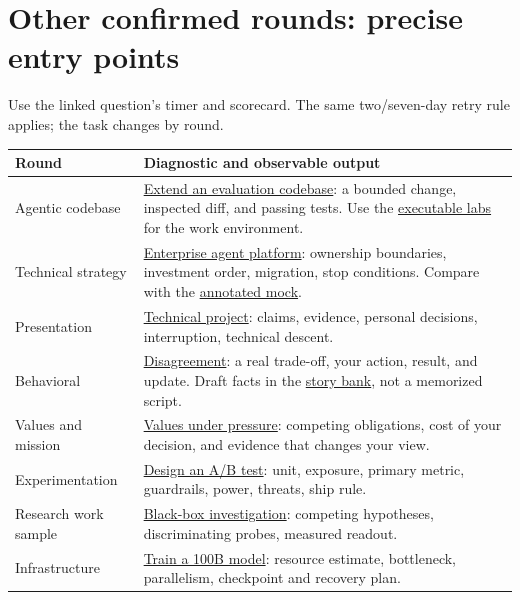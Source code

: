 \documentclass[10pt,letterpaper]{article}
\begin{document}
\newpage
\section*{Other confirmed rounds: precise entry points}
Use the linked question's timer and scorecard. The same two/seven-day retry rule applies; the task changes by round.
\par
\renewcommand{\arraystretch}{1.3}
\begin{tabularx}{\linewidth}{@{}p{.23\linewidth} X@{}}
\toprule
Round & Diagnostic and observable output \\
\midrule
Agentic codebase & \href{https://mlmentorship.com/questions/agentic-ml-codebase-interview/?practice=1}{Extend an evaluation codebase}: a bounded change, inspected diff, and passing tests. Use the \href{https://mlmentorship.com/prep/labs/}{executable labs} for the work environment. \\
Technical strategy & \href{https://mlmentorship.com/questions/design-enterprise-agent-platform/?practice=1}{Enterprise agent platform}: ownership boundaries, investment order, migration, stop conditions. Compare with the \href{https://mlmentorship.com/guides/annotated-upper-ic-agent-platform-mock/}{annotated mock}. \\
Presentation & \href{https://mlmentorship.com/questions/present-technical-ml-project/?practice=1}{Technical project}: claims, evidence, personal decisions, interruption, technical descent. \\
Behavioral & \href{https://mlmentorship.com/questions/disagreed-with-senior/?practice=1}{Disagreement}: a real trade-off, your action, result, and update. Draft facts in the \href{https://mlmentorship.com/prep/story-bank/}{story bank}, not a memorized script. \\
Values and mission & \href{https://mlmentorship.com/questions/defend-values-under-ethical-pressure/?practice=1}{Values under pressure}: competing obligations, cost of your decision, and evidence that changes your view. \\
Experimentation & \href{https://mlmentorship.com/questions/design-ml-ab-test/?practice=1}{Design an A/B test}: unit, exposure, primary metric, guardrails, power, threats, ship rule. \\
Research work sample & \href{https://mlmentorship.com/questions/investigate-black-box-model-behavior/?practice=1}{Black-box investigation}: competing hypotheses, discriminating probes, measured readout. \\
Infrastructure & \href{https://mlmentorship.com/questions/train-100b-model/?practice=1}{Train a 100B model}: resource estimate, bottleneck, parallelism, checkpoint and recovery plan. \\
\bottomrule
\end{tabularx}
\end{document}
